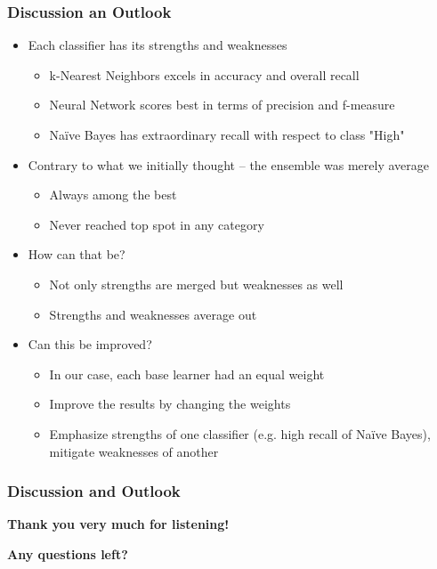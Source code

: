 \begin{frame}
  \frametitle{Discussion an Outlook}
  \begin{itemize}
    \item Each classifier has its strengths and weaknesses
      \begin{itemize}
        \item k-Nearest Neighbors excels in accuracy and overall recall
        \item Neural Network scores best in terms of precision and f-measure
        \item Na\"ive Bayes has extraordinary recall with respect to class "High"
      \end{itemize}
    \item Contrary to what we initially thought -- the ensemble was merely average
      \begin{itemize}
        \item Always among the best
        \item Never reached top spot in any category
      \end{itemize}
    \item How can that be?
      \begin{itemize}
        \item Not only strengths are merged but weaknesses as well
        \item Strengths and weaknesses average out
      \end{itemize}
    \item Can this be improved?
      \begin{itemize}
        \item In our case, each base learner had an equal weight
        \item Improve the results by changing the weights
        \item Emphasize strengths of one classifier (e.g. high recall
          of Na\"ive Bayes), mitigate weaknesses of another
      \end{itemize}
  \end{itemize}
\end{frame}

\begin{frame}[c]
  \frametitle{Discussion and Outlook}
  \center
  \textbf{Thank you very much for listening!}
  
  \textbf{Any questions left?}
\end{frame}
